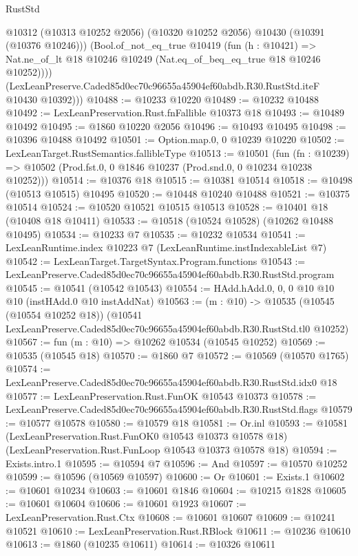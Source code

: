 \begin{lexlean}{RustStd}
\begin{coremodule}
          @10312 (@10313 @10252 @2056) (@10320 @10252 @2056) @10430 (@10391 (@10376 @10246)))
          (Bool.of_not_eq_true
            @10419
            (fun (h : @10421) =>
            Nat.ne_of_lt @18 @10246 @10249 (Nat.eq_of_beq_eq_true @18 @10246 @10252))))
        (LexLeanPreserve.Caded85d0ec70c96655a45904ef60abdb.R30.RustStd.iteF @10430 @10392)))
@10488 := @10233 @10220
@10489 := @10232 @10488
@10492 := LexLeanPreservation.Rust.fnFallible @10373 @18
@10493 := @10489 @10492
@10495 := @1860 @10220 @2056
@10496 := @10493 @10495
@10498 := @10396 @10488 @10492
@10501 := Option.map.{0, 0} @10239 @10220
@10502 := LexLeanTarget.RustSemantics.fallibleType
@10513 := @10501
    (fun (fn : @10239) =>
    @10502 (Prod.fst.{0, 0} @1846 @10237 (Prod.snd.{0, 0} @10234 @10238 @10252)))
@10514 := @10376 @18
@10515 := @10381 @10514
@10518 := @10498 (@10513 @10515) @10495
@10520 := @10448 @10240 @10488
@10521 := @10375 @10514
@10524 := @10520 @10521 @10515 @10513
@10528 := @10401 @18 (@10408 @18 @10411)
@10533 := @10518 (@10524 @10528) (@10262 @10488 @10495)
@10534 := @10233 @7
@10535 := @10232 @10534
@10541 := LexLeanRuntime.index @10223 @7 (LexLeanRuntime.instIndexableList @7)
@10542 := LexLeanTarget.TargetSyntax.Program.functions
@10543 := LexLeanPreserve.Caded85d0ec70c96655a45904ef60abdb.R30.RustStd.program
@10545 := @10541 (@10542 @10543)
@10554 := HAdd.hAdd.{0, 0, 0} @10 @10 @10 (instHAdd.{0} @10 instAddNat)
@10563 := (m : @10) ->
  @10535
    (@10545 (@10554 @10252 @18))
    (@10541 LexLeanPreserve.Caded85d0ec70c96655a45904ef60abdb.R30.RustStd.tl0 @10252)
@10567 := fun (m : @10) => @10262 @10534 (@10545 @10252)
@10569 := @10535 (@10545 @18)
@10570 := @1860 @7
@10572 := @10569 (@10570 @1765)
@10574 := LexLeanPreserve.Caded85d0ec70c96655a45904ef60abdb.R30.RustStd.idx0 @18
@10577 := LexLeanPreservation.Rust.FunOK @10543 @10373
@10578 := LexLeanPreserve.Caded85d0ec70c96655a45904ef60abdb.R30.RustStd.flags
@10579 := @10577 @10578
@10580 := @10579 @18
@10581 := Or.inl
@10593 := @10581
    (LexLeanPreservation.Rust.FunOK0 @10543 @10373 @10578 @18)
    (LexLeanPreservation.Rust.FunLoop @10543 @10373 @10578 @18)
@10594 := Exists.intro.{1}
@10595 := @10594 @7
@10596 := And
@10597 := @10570 @10252
@10599 := @10596 (@10569 @10597)
@10600 := Or
@10601 := Exists.{1}
@10602 := @10601 @10234
@10603 := @10601 @1846
@10604 := @10215 @1828
@10605 := @10601 @10604
@10606 := @10601 @1923
@10607 := LexLeanPreservation.Rust.Ctx
@10608 := @10601 @10607
@10609 := @10241 @10521
@10610 := LexLeanPreservation.Rust.RBlock
@10611 := @10236 @10610
@10613 := @1860 (@10235 @10611)
@10614 := @10326 @10611

\end{coremodule}
\end{lexlean}

